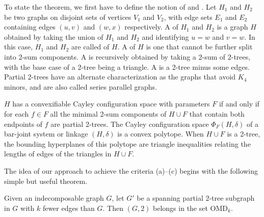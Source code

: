 To state the theorem, we first have to define the notion of
 and . Let $H_1$ and $H_2$ be two graphs on
disjoint sets of vertices $V_1$ and $V_2$, with edge sets $E_1$ and
$E_2$ containing edges $(u,v)$ and $(w,x)$ respectively.%
A  of $H_1$ and $H_2$ is a graph $H$ obtained by taking the
union of $H_1$ and $H_2$ and identifying $u=w$ and $v=w$. In this
case, $H_1$ and $H_2$ are called  of $H$. A
 of $H$ is  one that cannot be further
split into 2-sum components. A  is recursively obtained by
taking a 2-sum of 2-trees, with the base case of a 2-tree being a
triangle. A  is a 2-tree minus some edges. Partial
2-trees have an alternate characterization as the graphs that avoid
$K_4$ minors, and are also called series parallel graphs.

\begin{theorem}\label{theorem:convexcayley}
    \cite{sitharam2010convex} $H$ has a convexifiable Cayley configuration space  with
    parameters $F$ if and only if for each $f\in F$  all the minimal
    2-sum components of $H\cup F$ that contain both endpoints of $f$
    are partial 2-trees. The Cayley configuration space
    $\Phi_F(H,\delta)$ of a bar-joint system or linkage $(H,\delta)$
    is a convex polytope. When $H\cup F$ is a 2-tree, the bounding
    hyperplanes of this polytope are triangle inequalities relating
    the lengths of edges of the triangles in $H\cup F$.
\end{theorem}

The idea of our approach to achieve the criteria (a)--(c) begins with
the following simple but useful theorem.

\begin{theorem}\label{theorem:omdk}
    Given an indecomposable graph $G$, let $G'$ be a spanning partial
    2-tree subgraph in $G$ with $k$ fewer edges than $G$. Then
    $(G,2)$ belongs in the set OMD$_k$.
\end{theorem}


